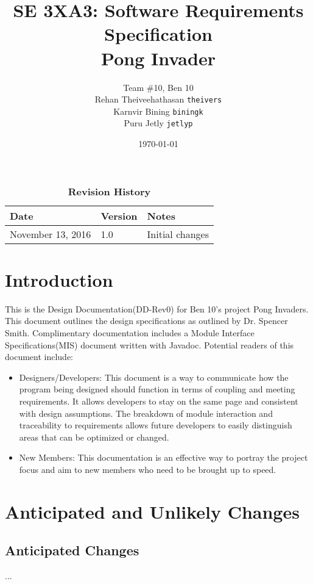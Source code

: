 \documentclass[12pt, titlepage]{article}
\title{SE 3XA3: Software Requirements Specification\\Pong Invader}
\author{Team \#10, Ben 10
		\\ Rehan Theiveehathasan \texttt{theivers}
		\\ Karnvir Bining                  \texttt{biningk}
		\\ Puru Jetly                        \texttt{jetlyp}
}
\date{\today}
\newcounter{acnum}
\newcommand{\actheacnum}{AC\theacnum}
\begin{document}
\maketitle
{}
\tableofcontents
\listoftables
\listoffigures
\begin{table}[bp]
\caption{\bf Revision History}
\begin{tabularx}{\textwidth}{p{3cm}p{2cm}X}
\toprule {\bf Date} & {\bf Version} & {\bf Notes}\\
\midrule
November 13, 2016 & 1.0 & Initial changes\\

\bottomrule
\end{tabularx}
\end{table}
\newpage
{}
\section{Introduction}
This is the Design Documentation(DD-Rev0) for Ben 10’s project Pong Invaders. This document outlines the design specifications as outlined by Dr. Spencer Smith.
Complimentary documentation includes a Module Interface Specifications(MIS) document written with Javadoc.  Potential readers of this document include:
\begin{itemize}
\item Designers/Developers: This document is a way to communicate how the program being designed should function in terms of coupling and meeting requirements. It allows developers to stay on the same page and consistent with design assumptions. The breakdown of module interaction and traceability to requirements allows future developers to easily distinguish areas that can be optimized or changed. 
\item New Members: This documentation is an effective way to portray the project focus and aim to new members who need to be brought up to speed. 
\end{itemize}

\section{Anticipated and Unlikely Changes} \label{SecChange}

\subsection{Anticipated Changes} \label{SecAchange}

\begin{description}
\item[ \actheacnum \label{acHardware}:] 
\item[ \actheacnum \label{acInput}:] 
\item ...
\end{description}
\end{document}
